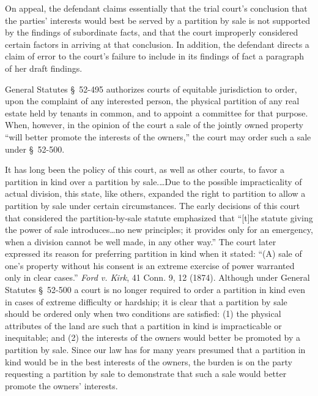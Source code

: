 On appeal, the defendant claims essentially that the trial court's conclusion
that the parties' interests would best be served by a partition by sale is not
supported by the findings of subordinate facts, and that the court improperly
considered certain factors in arriving at that conclusion. In addition, the
defendant directs a claim of error to the court's failure to include in its
findings of fact a paragraph of her draft findings.

General Statutes \S~52-495 authorizes courts of equitable jurisdiction to order,
upon the complaint of any interested person, the physical partition of any real
estate held by tenants in common, and to appoint a committee for that
purpose. When, however, in the opinion of the court a sale of the
jointly owned property ``will better promote the interests of the owners,'' the
court may order such a sale under \S~52-500.

It has long been the policy of this court, as well as other courts, to favor a
partition in kind over a partition by sale.\dots Due to the possible
impracticality of actual division, this state, like others, expanded the right
to partition to allow a partition by sale under certain circumstances. The
early decisions of this court that considered the partition-by-sale statute
emphasized that ``[t]he statute giving the power of sale introduces\dots no
new principles; it provides only for an emergency, when a division cannot be
well made, in any other way.'' The court later expressed its reason for
preferring partition in kind when it stated: ``(A) sale of one's property
without his consent is an extreme exercise of power warranted only in clear
cases.'' \emph{Ford v. Kirk}, 41 Conn. 9, 12 (1874). Although under General
Statutes \S~52-500 a court is no longer required to order a partition in kind
even in cases
of extreme difficulty or hardship; it is clear that a partition by sale should
be ordered only when two conditions are satisfied: (1) the physical attributes
of the land are such that a partition in kind is impracticable or inequitable;
and (2) the interests of the owners would better be promoted by a partition by
sale. Since our law has for many years presumed that a partition in kind would
be in the best interests of the owners, the burden is on the party requesting a
partition by sale to demonstrate that such a sale would better promote the
owners' interests.

